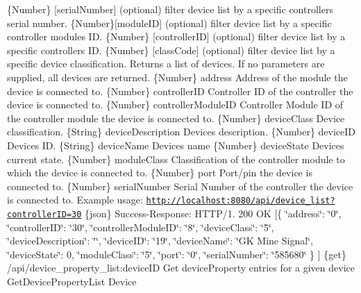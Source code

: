 \{Number\} \mbox{[}serial\+Number\mbox{]} (optional) filter device list by a specific controller\textquotesingle{}s serial number.  \{Number\}\mbox{[}module\+ID\mbox{]} (optional) filter device list by a specific controller module\textquotesingle{}s ID.  \{Number\} \mbox{[}controller\+ID\mbox{]} (optional) filter device list by a specific controller\textquotesingle{}s ID.  \{Number\} \mbox{[}class\+Code\mbox{]} (optional) filter device list by a specific device classification.  Returns a list of devices. If no parameters are supplied, all devices are returned.  \{Number\} address Address of the module the device is connected to.  \{Number\} controller\+ID Controller ID of the controller the device is connected to.  \{Number\} controller\+Module\+ID Controller Module ID of the controller module the device is connected to.  \{Number\} device\+Class Device classification.  \{String\} device\+Description Device\textquotesingle{}s description.  \{Number\} device\+ID Device\textquotesingle{}s ID.  \{String\} device\+Name Device\textquotesingle{}s name  \{Number\} device\+State Device\textquotesingle{}s current state.  \{Number\} module\+Class Classification of the controller module to which the device is connected to.  \{Number\} port Port/pin the device is connected to.  \{Number\} serial\+Number Serial Number of the controller the device is connected to.  Example usage\+: \href{http://localhost:8080/api/device_list?controllerID=30}{\tt http\+://localhost\+:8080/api/device\+\_\+list?controller\+I\+D=30}  \{json\} Success-\/\+Response\+: H\+T\+T\+P/1. 200 OK \mbox{[}\{ \char`\"{}address\char`\"{}\+: \char`\"{}0\char`\"{}, \char`\"{}controller\+I\+D\char`\"{}\+: \char`\"{}30\char`\"{}, \char`\"{}controller\+Module\+I\+D\char`\"{}\+: \char`\"{}8\char`\"{}, \char`\"{}device\+Class\char`\"{}\+: \char`\"{}5\char`\"{}, \char`\"{}device\+Description\char`\"{}\+: \char`\"{}\char`\"{}, \char`\"{}device\+I\+D\char`\"{}\+: \char`\"{}19\char`\"{}, \char`\"{}device\+Name\char`\"{}\+: \char`\"{}\+G\+K Mine Signal\char`\"{}, \char`\"{}device\+State\char`\"{}\+: 0, \char`\"{}module\+Class\char`\"{}\+: \char`\"{}5\char`\"{}, \char`\"{}port\char`\"{}\+: \char`\"{}0\char`\"{}, \char`\"{}serial\+Number\char`\"{}\+: \char`\"{}585680\char`\"{} \} \mbox{]}  \{get\} /api/device\+\_\+property\+\_\+list\+:device\+ID Get device\+Property entries for a given device  Get\+Device\+Property\+List  Device

